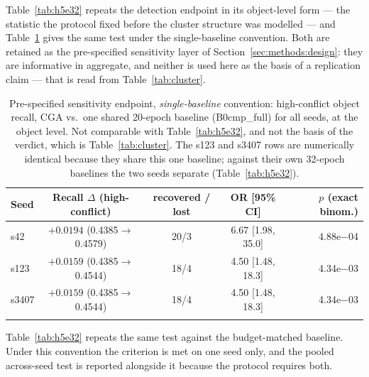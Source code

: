 \documentclass[pdflatex,sn-mathphys-num]{sn-jnl}
\theoremstyle{thmstyleone}%
\theoremstyle{thmstyletwo}%
\theoremstyle{thmstylethree}%
\begin{document}
Table~\ref{tab:h5e32} repeats the detection endpoint in its object-level form --- the statistic the protocol fixed before the cluster structure was modelled --- and Table~\ref{tab:h5} gives the same test under the single-baseline convention. Both are retained as the pre-specified sensitivity layer of Section~\ref{sec:methods:design}: they are informative in aggregate, and neither is used here as the basis of a replication claim --- that is read from Table~\ref{tab:cluster}.

\begin{table}[t]
\caption{Pre-specified sensitivity endpoint, \emph{single-baseline} convention: high-conflict object recall, CGA vs.\ one shared 20-epoch baseline (B0cmp\_full) for all seeds, at the object level. Not comparable with Table~\ref{tab:h5e32}, and not the basis of the verdict, which is Table~\ref{tab:cluster}. The s123 and s3407 rows are numerically identical because they share this one baseline; against their own 32-epoch baselines the two seeds separate (Table~\ref{tab:h5e32}).}
\label{tab:h5}%
\footnotesize
\setlength{\tabcolsep}{4pt}
\begin{tabular}{@{}lcccr@{}}
\toprule
Seed & Recall $\Delta$ (high-conflict) & recovered / lost & OR [95\% CI] & $p$ (exact binom.) \\
\midrule
s42 & $+0.0194$ (0.4385$\to$0.4579) & 20/3 & 6.67 [1.98, 35.0] & 4.88e$-$04 \\
s123 & $+0.0159$ (0.4385$\to$0.4544) & 18/4 & 4.50 [1.48, 18.3] & 4.34e$-$03 \\
s3407 & $+0.0159$ (0.4385$\to$0.4544) & 18/4 & 4.50 [1.48, 18.3] & 4.34e$-$03 \\
\botrule
\end{tabular}
\end{table}

Table~\ref{tab:h5e32} repeats the same test against the budget-matched baseline. Under this convention the criterion is met on one seed only, and the pooled across-seed test is reported alongside it because the protocol requires both.
\end{document}
